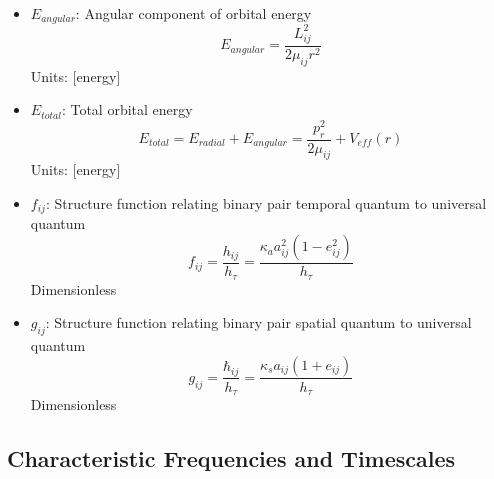 \documentclass{article}
\begin{document}
\begin{itemize}
\item $E_{angular}$: Angular component of orbital energy
    \begin{equation}
    E_{angular} = \frac{L_{ij}^2}{2\mu_{ij}r^2}
    \end{equation}
    Units: [energy]
    
\item $E_{total}$: Total orbital energy
    \begin{equation}
    E_{total} = E_{radial} + E_{angular} = \frac{p_r^2}{2\mu_{ij}} + V_{eff}(r)
    \end{equation}
    Units: [energy]

\item $f_{ij}$: Structure function relating binary pair temporal quantum to universal quantum
    \begin{equation}
    f_{ij} = \frac{h_{ij}}{h_\tau} = \frac{\kappa_a a_{ij}^2(1-e_{ij}^2)}{h_\tau}
    \end{equation}
    Dimensionless
    
\item $g_{ij}$: Structure function relating binary pair spatial quantum to universal quantum
    \begin{equation}
    g_{ij} = \frac{\hbar_{ij}}{h_\tau} = \frac{\kappa_s a_{ij}(1+e_{ij})}{h_\tau}
    \end{equation}
    Dimensionless
\end{itemize}

\subsection{Characteristic Frequencies and Timescales}
\end{document}
